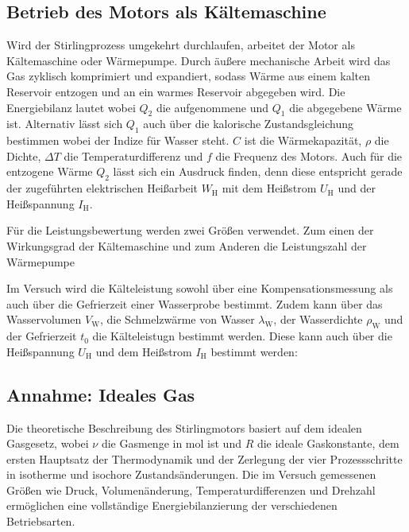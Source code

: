 \subsection{Betrieb des Motors als Kältemaschine} \label{ssec:SterKa}

Wird der Stirlingprozess umgekehrt durchlaufen, arbeitet der Motor als Kältemaschine oder Wärmepumpe. Durch äußere mechanische Arbeit wird das Gas zyklisch komprimiert und expandiert, sodass Wärme aus einem kalten Reservoir entzogen und an ein warmes Reservoir abgegeben wird. Die Energiebilanz lautet
wobei \(Q_2\) die aufgenommene und \(Q_1\) die abgegebene Wärme ist. Alternativ lässt sich $Q_1$ auch über die kalorische Zustandsgleichung bestimmen
wobei der Indize für Wasser steht. $C$ ist die Wärmekapazität, $\rho$ die Dichte, $\Delta T$ die Temperaturdifferenz und $f$ die Frequenz des Motors.
Auch für die entzogene Wärme $Q_2$ lässt sich ein Ausdruck finden, denn diese entspricht gerade der zugeführten elektrischen Heißarbeit $W_\text{H}$
mit dem Heißstrom $U_\text{H}$ und der Heißspannung $I_\text{H}$.

Für die Leistungsbewertung werden zwei Größen verwendet. Zum einen der Wirkungsgrad der Kältemaschine
und zum Anderen die Leistungszahl der Wärmepumpe


Im Versuch wird die Kälteleistung sowohl über eine Kompensationsmessung als auch über die Gefrierzeit einer Wasserprobe bestimmt.
Zudem kann über das Wasservolumen $V_\text{W}$, die Schmelzwärme von Wasser $\lambda_\text{W}$, der Wasserdichte $\rho_\text{W}$ und der Gefrierzeit $t_0$ die Kälteleistugn 
bestimmt werden. Diese kann auch über die Heißspannung $U_\text{H}$ und dem Heißstrom $I_\text{H}$ bestimmt werden:

\subsection{Annahme: Ideales Gas}
Die theoretische Beschreibung des Stirlingmotors basiert auf dem idealen Gasgesetz,
wobei $\nu$ die Gasmenge in mol ist und $R$ die ideale Gaskonstante, dem ersten Hauptsatz der Thermodynamik  und der Zerlegung der vier Prozessschritte in isotherme und isochore Zustandsänderungen. Die im Versuch gemessenen Größen wie Druck, Volumenänderung, Temperaturdifferenzen und Drehzahl ermöglichen eine vollständige Energiebilanzierung der verschiedenen Betriebsarten.



